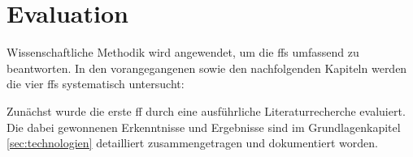 \section{Evaluation} \label{sec:evaluation}

Wissenschaftliche Methodik wird angewendet, um die \aclp{ff} umfassend zu beantworten. In den vorangegangenen sowie den nachfolgenden Kapiteln werden die vier \aclp{ff} systematisch untersucht:

Zunächst wurde die erste \acl{ff} durch eine ausführliche Literaturrecherche evaluiert. Die dabei gewonnenen Erkenntnisse und Ergebnisse sind im Grundlagenkapitel \ref{sec:technologien} detailliert zusammengetragen und dokumentiert worden.

